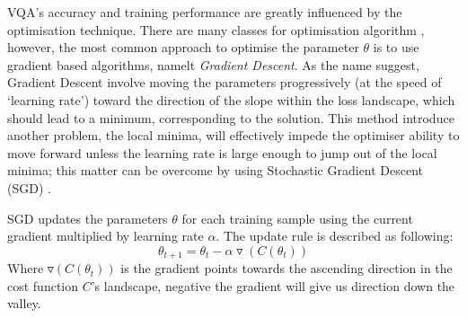 VQA's accuracy and training performance are greatly influenced by the optimisation technique.
There are many classes for optimisation algorithm \cite{zaheerStudyOptimizationAlgorithms2019a}, however, the most common approach to optimise the parameter $\theta$ is to use gradient based algorithms, namelt \emph{Gradient Descent}.
As the name suggest, Gradient Descent involve moving the parameters progressively (at the speed of `learning rate') toward the direction of the slope within the loss landscape, which should lead to a minimum, corresponding to the solution.
This method introduce another problem, the local minima, will effectively impede the optimiser ability to move forward unless the learning rate is large enough to jump out of the local minima; this matter can be overcome by using Stochastic Gradient Descent (SGD) \cite{ruderOverviewGradientDescent2017}.

SGD updates the parameters $\theta$ for each training sample using the current gradient multiplied by learning rate $\alpha$.
The update rule is described as following:
\begin{equation}
    \theta_{t+1} = \theta_t - \alpha \triangledown(C(\theta_t))
    \label{Eqn: SGD update rule}
\end{equation}
Where $\triangledown(C(\theta_t))$ is the gradient points towards the ascending direction in the cost function $C$'s landscape, negative the gradient will give us direction down the valley.

